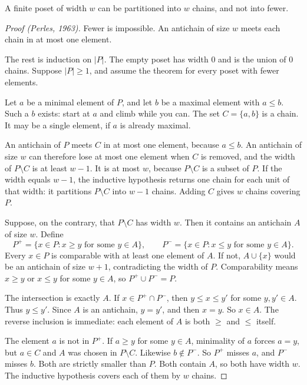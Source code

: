\begin{theorem}[Dilworth, 1950]\label{orders:thm:dilworth}
A finite poset of width $w$ can be partitioned into $w$ chains, and not into fewer.
\end{theorem}
\begin{proof}[Proof (Perles, 1963)]
Fewer is impossible. An antichain of size $w$ meets each chain in at most one element.

The rest is induction on $|P|$. The empty poset has width $0$ and is the union of $0$ chains. Suppose $|P|\ge 1$, and assume the theorem for every poset with fewer elements.

Let $a$ be a minimal element of $P$, and let $b$ be a maximal element with $a\le b$. Such a $b$ exists: start at $a$ and climb while you can. The set $C=\{a,b\}$ is a chain. It may be a single element, if $a$ is already maximal.

An antichain of $P$ meets $C$ in at most one element, because $a\le b$. An antichain of size $w$ can therefore lose at most one element when $C$ is removed, and the width of $P\setminus C$ is at least $w-1$. It is at most $w$, because $P\setminus C$ is a subset of $P$. If the width equals $w-1$, the inductive hypothesis returns one chain for each unit of that width: it partitions $P\setminus C$ into $w-1$ chains. Adding $C$ gives $w$ chains covering $P$.

Suppose, on the contrary, that $P\setminus C$ has width $w$. Then it contains an antichain $A$ of size $w$. Define
\[
P^+=\{x\in P:x\ge y\text{ for some }y\in A\},\qquad
P^-=\{x\in P:x\le y\text{ for some }y\in A\}.
\]
Every $x\in P$ is comparable with at least one element of $A$. If not, $A\cup\{x\}$ would be an antichain of size $w+1$, contradicting the width of $P$. Comparability means $x\ge y$ or $x\le y$ for some $y\in A$, so $P^+\cup P^-=P$.

The intersection is exactly $A$. If $x\in P^+\cap P^-$, then $y\le x\le y'$ for some $y,y'\in A$. Thus $y\le y'$. Since $A$ is an antichain, $y=y'$, and then $x=y$. So $x\in A$. The reverse inclusion is immediate: each element of $A$ is both $\ge$ and $\le$ itself.

The element $a$ is not in $P^+$. If $a\ge y$ for some $y\in A$, minimality of $a$ forces $a=y$, but $a\in C$ and $A$ was chosen in $P\setminus C$. Likewise $b\notin P^-$. So $P^+$ misses $a$, and $P^-$ misses $b$. Both are strictly smaller than $P$. Both contain $A$, so both have width $w$. The inductive hypothesis covers each of them by $w$ chains.


\end{proof}
